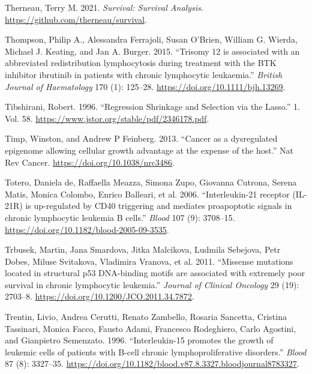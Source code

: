 \documentclass[11pt, a4paper, twosided]{book}
\newenvironment{CSLReferences}%
  {}%
  {\par}
\begin{document}
\begin{CSLReferences}{1}{0}
\leavevmode{}%
Therneau, Terry M. 2021. \emph{Survival: Survival Analysis}. \url{https://github.com/therneau/survival}.

\leavevmode{}%
Thompson, Philip A., Alessandra Ferrajoli, Susan O'Brien, William G. Wierda, Michael J. Keating, and Jan A. Burger. 2015. {``{Trisomy 12 is associated with an abbreviated redistribution lymphocytosis during treatment with the BTK inhibitor ibrutinib in patients with chronic lymphocytic leukaemia}.''} \emph{British Journal of Haematology} 170 (1): 125--28. \url{https://doi.org/10.1111/bjh.13269}.

\leavevmode{}%
Tibshirani, Robert. 1996. {``{Regression Shrinkage and Selection via the Lasso}.''} 1. Vol. 58. \url{https://www.jstor.org/stable/pdf/2346178.pdf}.

\leavevmode{}%
Timp, Winston, and Andrew P Feinberg. 2013. {``{Cancer as a dysregulated epigenome allowing cellular growth advantage at the expense of the host}.''} Nat Rev Cancer. \url{https://doi.org/10.1038/nrc3486}.

\leavevmode{}%
Totero, Daniela de, Raffaella Meazza, Simona Zupo, Giovanna Cutrona, Serena Matis, Monica Colombo, Enrico Balleari, et al. 2006. {``{Interleukin-21 receptor (IL-21R) is up-regulated by CD40 triggering and mediates proapoptotic signals in chronic lymphocytic leukemia B cells.}''} \emph{Blood} 107 (9): 3708--15. \url{https://doi.org/10.1182/blood-2005-09-3535}.

\leavevmode{}%
Trbusek, Martin, Jana Smardova, Jitka Malcikova, Ludmila Sebejova, Petr Dobes, Miluse Svitakova, Vladimira Vranova, et al. 2011. {``{Missense mutations located in structural p53 DNA-binding motifs are associated with extremely poor survival in chronic lymphocytic leukemia}.''} \emph{Journal of Clinical Oncology} 29 (19): 2703--8. \url{https://doi.org/10.1200/JCO.2011.34.7872}.

\leavevmode{}%
Trentin, Livio, Andrea Cerutti, Renato Zambello, Rosaria Sancetta, Cristina Tassinari, Monica Facco, Fausto Adami, Francesco Rodeghiero, Carlo Agostini, and Gianpietro Semenzato. 1996. {``{Interleukin-15 promotes the growth of leukemic cells of patients with B-cell chronic lymphoproliferative disorders}.''} \emph{Blood} 87 (8): 3327--35. \url{https://doi.org/10.1182/blood.v87.8.3327.bloodjournal8783327}.


\end{CSLReferences}
\end{document}
